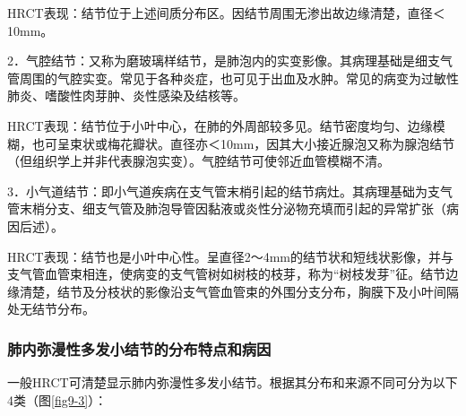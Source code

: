 HRCT表现：结节位于上述间质分布区。因结节周围无渗出故边缘清楚，直径＜10mm。

2．气腔结节：又称为磨玻璃样结节，是肺泡内的实变影像。其病理基础是细支气管周围的气腔实变。常见于各种炎症，也可见于出血及水肿。常见的病变为过敏性肺炎、嗜酸性肉芽肿、炎性感染及结核等。

HRCT表现：结节位于小叶中心，在肺的外周部较多见。结节密度均匀、边缘模糊，也可呈束状或梅花瓣状。直径亦＜10mm，因其大小接近腺泡又称为腺泡结节（但组织学上并非代表腺泡实变）。气腔结节可使邻近血管模糊不清。

3．小气道结节：即小气道疾病在支气管末梢引起的结节病灶。其病理基础为支气管末梢分支、细支气管及肺泡导管因黏液或炎性分泌物充填而引起的异常扩张（病因后述）。

HRCT表现：结节也是小叶中心性。呈直径2～4mm的结节状和短线状影像，并与支气管血管束相连，使病变的支气管树如树枝的枝芽，称为“树枝发芽”征。结节边缘清楚，结节及分枝状的影像沿支气管血管束的外围分支分布，胸膜下及小叶间隔处无结节分布。

\subsubsection{肺内弥漫性多发小结节的分布特点和病因}

一般HRCT可清楚显示肺内弥漫性多发小结节。根据其分布和来源不同可分为以下4类（图\ref{fig9-3}）：

